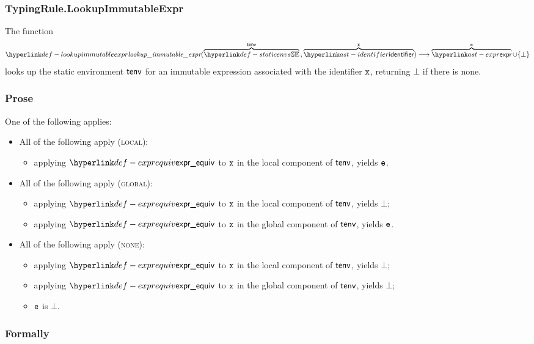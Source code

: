 \subsubsection{TypingRule.LookupImmutableExpr\label{sec:TypingRule.LookupImmutableExpr}}
\hypertarget{def-lookupimmutableexpr}{}
The function
\[
\lookupimmutableexpr(\overname{\staticenvs}{\tenv} \aslsep \overname{\identifier}{\vx}) \aslto \overname{\expr}{\ve} \cup \{\bot\}
\]
looks up the static environment $\tenv$ for an immutable expression associated with the identifier $\vx$,
returning $\bot$ if there is none.

\subsubsection{Prose}
One of the following applies:
\begin{itemize}
  \item All of the following apply (\textsc{local}):
  \begin{itemize}
    \item applying $\exprequiv$ to $\vx$ in the local component of $\tenv$, yields $\ve$.
  \end{itemize}

  \item All of the following apply (\textsc{global}):
  \begin{itemize}
    \item applying $\exprequiv$ to $\vx$ in the local component of $\tenv$, yields $\bot$;
    \item applying $\exprequiv$ to $\vx$ in the global component of $\tenv$, yields $\ve$.
  \end{itemize}

  \item All of the following apply (\textsc{none}):
  \begin{itemize}
    \item applying $\exprequiv$ to $\vx$ in the local component of $\tenv$, yields $\bot$;
    \item applying $\exprequiv$ to $\vx$ in the global component of $\tenv$, yields $\bot$;
    \item $\ve$ is $\bot$.
  \end{itemize}
\end{itemize}
\subsubsection{Formally}
\begin{mathpar}
\end{mathpar}

